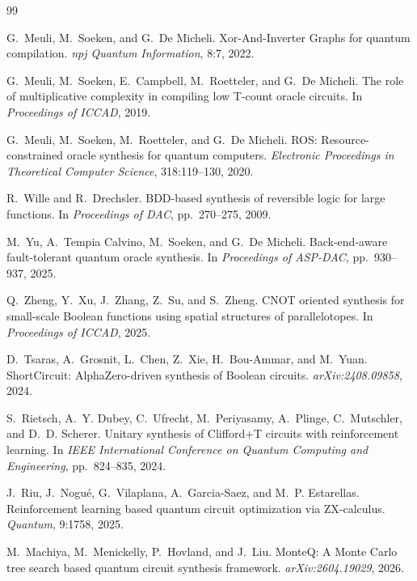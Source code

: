 \documentclass[UTF8,fontset=macnew,11pt]{ctexart}
\begin{document}
\begin{thebibliography}{99}

G.~Meuli, M.~Soeken, and G.~De Micheli.
\newblock Xor-And-Inverter Graphs for quantum compilation.
\newblock \emph{npj Quantum Information}, 8:7, 2022.

G.~Meuli, M.~Soeken, E.~Campbell, M.~Roetteler, and G.~De Micheli.
\newblock The role of multiplicative complexity in compiling low T-count oracle circuits.
\newblock In \emph{Proceedings of ICCAD}, 2019.

G.~Meuli, M.~Soeken, M.~Roetteler, and G.~De Micheli.
\newblock ROS: Resource-constrained oracle synthesis for quantum computers.
\newblock \emph{Electronic Proceedings in Theoretical Computer Science}, 318:119--130, 2020.

R.~Wille and R.~Drechsler.
\newblock BDD-based synthesis of reversible logic for large functions.
\newblock In \emph{Proceedings of DAC}, pp.~270--275, 2009.

M.~Yu, A.~Tempia Calvino, M.~Soeken, and G.~De Micheli.
\newblock Back-end-aware fault-tolerant quantum oracle synthesis.
\newblock In \emph{Proceedings of ASP-DAC}, pp.~930--937, 2025.

Q.~Zheng, Y.~Xu, J.~Zhang, Z.~Su, and S.~Zheng.
\newblock CNOT oriented synthesis for small-scale Boolean functions using spatial structures of parallelotopes.
\newblock In \emph{Proceedings of ICCAD}, 2025.

D.~Tsaras, A.~Grosnit, L.~Chen, Z.~Xie, H.~Bou-Ammar, and M.~Yuan.
\newblock ShortCircuit: AlphaZero-driven synthesis of Boolean circuits.
\newblock \emph{arXiv:2408.09858}, 2024.

S.~Rietsch, A.~Y. Dubey, C.~Ufrecht, M.~Periyasamy, A.~Plinge, C.~Mutschler, and D.~D. Scherer.
\newblock Unitary synthesis of Clifford+T circuits with reinforcement learning.
\newblock In \emph{IEEE International Conference on Quantum Computing and Engineering}, pp.~824--835, 2024.

J.~Riu, J.~Nogu{\'e}, G.~Vilaplana, A.~Garcia-Saez, and M.~P. Estarellas.
\newblock Reinforcement learning based quantum circuit optimization via ZX-calculus.
\newblock \emph{Quantum}, 9:1758, 2025.

M.~Machiya, M.~Menickelly, P.~Hovland, and J.~Liu.
\newblock MonteQ: A Monte Carlo tree search based quantum circuit synthesis framework.
\newblock \emph{arXiv:2604.19029}, 2026.

\end{thebibliography}
\end{document}
